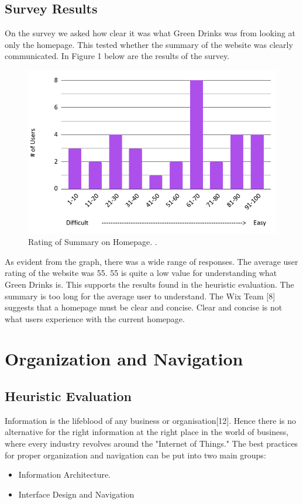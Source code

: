 \documentclass[12pt]{article}
\begin{document}
\subsection{Survey Results}
On the survey we asked how clear it was what Green Drinks was from looking at only the homepage. This tested whether the summary of the website was clearly communicated. In Figure 1 below are the results of the survey.



\begin{figure}[ht]
\centering
\includegraphics[width=1.0\textwidth]{f1}
\caption[Rating of Summary on Homepage. ]{Rating of Summary on Homepage. \footnotemark.}
\end{figure}
As evident from the graph, there was a wide range of responses. The average user rating of the website was 55. 55 is quite a low value for understanding what Green Drinks is. This supports the results found in the heuristic evaluation. The summary is too long for the average user to understand. The Wix Team [8] suggests that a homepage must be clear and concise. Clear and concise is not what users experience with the current homepage.





\section{Organization and Navigation}
\subsection{Heuristic Evaluation}
Information is the lifeblood of any business or organisation[12]. Hence there is no alternative for the right information at the right place in the world of business, where every industry revolves around the "Internet of Things." The best practices for proper organization and navigation can be put into two  main groups:
\begin{itemize}
\item Information Architecture.
\item Interface Design and Navigation
\end{itemize}
\end{document}
